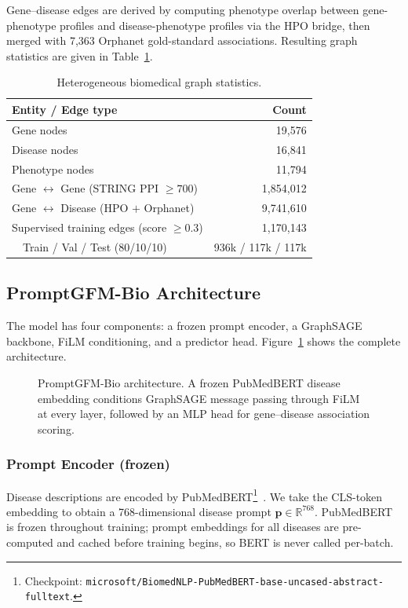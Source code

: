 \documentclass[conference]{IEEEtran}
\begin{document}
Gene--disease edges are derived by computing phenotype overlap between gene-phenotype profiles and disease-phenotype profiles via the HPO bridge, then merged with 7{,}363 Orphanet gold-standard associations. Resulting graph statistics are given in Table~\ref{tab:graphstats}.

\begin{table}[t]
\centering
\caption{Heterogeneous biomedical graph statistics.}
\label{tab:graphstats}
\small
\begin{tabular}{@{}p{}r@{}}
\toprule
\textbf{Entity / Edge type} & \textbf{Count} \\
\midrule
Gene nodes & 19{,}576 \\
Disease nodes & 16{,}841 \\
Phenotype nodes & 11{,}794 \\
Gene $\leftrightarrow$ Gene (STRING PPI $\geq\!700$) & 1{,}854{,}012 \\
Gene $\leftrightarrow$ Disease (HPO $+$ Orphanet) & 9{,}741{,}610 \\
\midrule
Supervised training edges (score $\geq\!0.3$) & 1{,}170{,}143 \\
\ \ Train / Val / Test (80/10/10) & 936k / 117k / 117k \\
\bottomrule
\end{tabular}
\end{table}

\subsection{PromptGFM-Bio Architecture}
The model has four components: a frozen prompt encoder, a GraphSAGE backbone, FiLM conditioning, and a predictor head. Figure~\ref{fig:promptgfm_architecture} shows the complete architecture.

\begin{figure}[t]
\centering

\caption{PromptGFM-Bio architecture. A frozen PubMedBERT disease embedding conditions GraphSAGE message passing through FiLM at every layer, followed by an MLP head for gene--disease association scoring.}
\label{fig:promptgfm_architecture}
\end{figure}

\subsubsection{Prompt Encoder (frozen)}
Disease descriptions are encoded by PubMedBERT\footnote{Checkpoint: \texttt{microsoft/BiomedNLP-PubMedBERT-base-\allowbreak uncased-abstract-fulltext}.}~\cite{gu2021pubmedbert}. We take the CLS-token embedding to obtain a 768-dimensional disease prompt $\bm{p}\in\mathbb{R}^{768}$. PubMedBERT is frozen throughout training; prompt embeddings for all diseases are pre-computed and cached before training begins, so BERT is never called per-batch.
\end{document}
